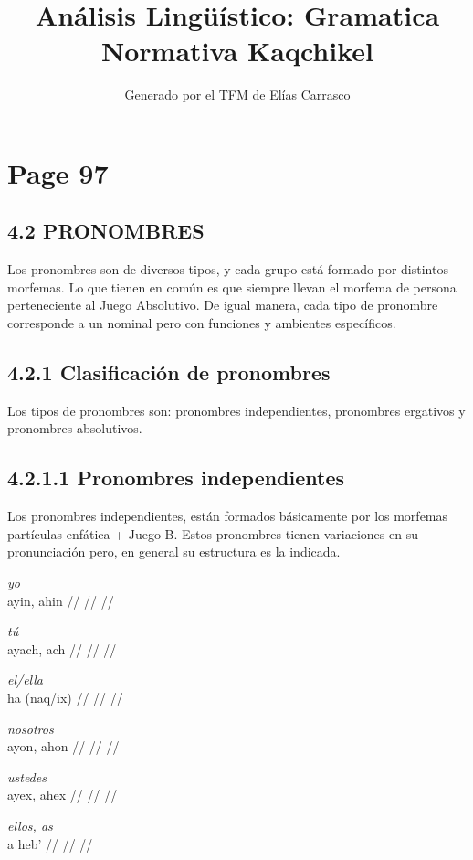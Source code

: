 \documentclass{article}%
\title{Análisis Lingüístico: Gramatica Normativa Kaqchikel}%
\author{Generado por el TFM de Elías Carrasco}%
\begin{document}
%
\normalsize%
\maketitle%
\section{Page 97}%
\label{sec:Page97}%
\subsection{4.2 PRONOMBRES}%
\label{subsec:4.2PRONOMBRES}%

%
Los pronombres son de diversos tipos, y cada grupo está formado por distintos %
morfemas. Lo que tienen en común es que siempre llevan el morfema de persona %
perteneciente al Juego Absolutivo. De igual manera, cada tipo de pronombre corresponde %
a un nominal pero con funciones y ambientes específicos. %
\subsection{4.2.1 Clasificación de pronombres}%
\label{subsec:4.2.1Clasificacindepronombres}%

%
Los tipos de pronombres son: pronombres independientes, pronombres ergativos y %
pronombres absolutivos. %
\subsection{4.2.1.1 Pronombres independientes}%
\label{subsec:4.2.1.1Pronombresindependientes}%

%
Los pronombres independientes, están formados básicamente por los morfemas %
partículas enfática + Juego B. Estos pronombres tienen variaciones en su %
pronunciación pero, en general su estructura es la indicada. %
\par\medskip%
\ex
\textit{yo} \\
\begingl
\gla ayin, ahin //
\glb  //
\glc  //
\endgl
\xe
%
\medskip%
\par\medskip%
\ex
\textit{tú} \\
\begingl
\gla ayach, ach //
\glb  //
\glc  //
\endgl
\xe
%
\medskip%
\par\medskip%
\ex
\textit{el/ella} \\
\begingl
\gla ha (naq/ix) //
\glb  //
\glc  //
\endgl
\xe
%
\medskip%
\par\medskip%
\ex
\textit{nosotros} \\
\begingl
\gla ayon, ahon //
\glb  //
\glc  //
\endgl
\xe
%
\medskip%
\par\medskip%
\ex
\textit{ustedes} \\
\begingl
\gla ayex, ahex //
\glb  //
\glc  //
\endgl
\xe
%
\medskip%
\par\medskip%
\ex
\textit{ellos, as} \\
\begingl
\gla a heb' //
\glb  //
\glc  //
\endgl
\xe
%
\medskip%
\end{document}
